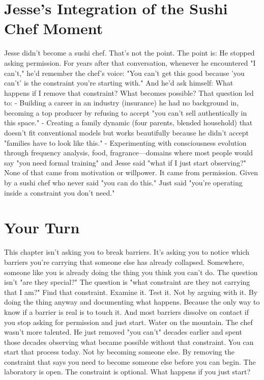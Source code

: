 \documentclass[12pt,openany]{book}
\begin{document}
\section{Jesse's Integration of the Sushi Chef Moment}

Jesse didn't become a sushi chef. That's not the point.
The point is: He stopped asking permission.
For years after that conversation, whenever he encountered "I can't," he'd remember the chef's voice: "You can't get this good because 'you can't' is the constraint you're starting with."
And he'd ask himself: What happens if I remove that constraint? What becomes possible?
That question led to:
- Building a career in an industry (insurance) he had no background in, becoming a top producer by refusing to accept "you can't sell authentically in this space."
- Creating a family dynamic (four parents, blended household) that doesn't fit conventional models but works beautifully because he didn't accept "families have to look like this."
- Experimenting with consciousness evolution through frequency analysis, food, fragrance—domains where most people would say "you need formal training" and Jesse said "what if I just start observing?"
None of that came from motivation or willpower.
It came from permission. Given by a sushi chef who never said "you can do this." Just said "you're operating inside a constraint you don't need."

\section{Your Turn}

This chapter isn't asking you to break barriers. It's asking you to notice which barriers you're carrying that someone else has already collapsed.
Somewhere, someone like you is already doing the thing you think you can't do.
The question isn't "are they special?" The question is "what constraint are they not carrying that I am?"
Find that constraint. Examine it. Test it.
Not by arguing with it. By doing the thing anyway and documenting what happens.
Because the only way to know if a barrier is real is to touch it. And most barriers dissolve on contact if you stop asking for permission and just start.
Water on the mountain.
The chef wasn't more talented. He just removed "you can't" decades earlier and spent those decades observing what became possible without that constraint.
You can start that process today.
Not by becoming someone else. By removing the constraint that says you need to become someone else before you can begin.
The laboratory is open. The constraint is optional.
What happens if you just start?
\end{document}
